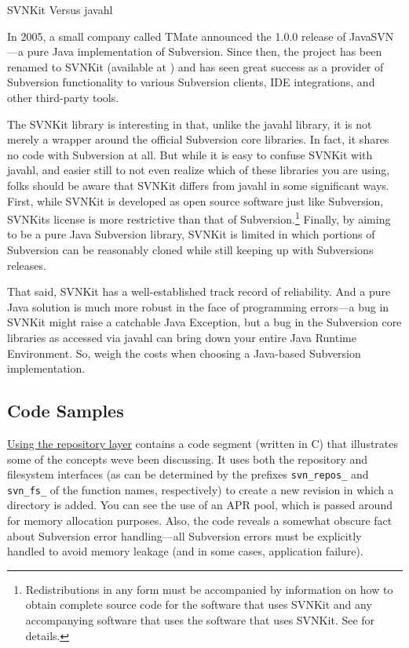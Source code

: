SVNKit Versus javahl

In 2005, a small company called TMate announced the 1.0.0 release of
JavaSVN---a pure Java implementation of Subversion. Since then, the
project has been renamed to SVNKit (available at
\href{https://svnkit.com/}{}) and has seen great success as a provider
of Subversion functionality to various Subversion clients, IDE
integrations, and other third-party tools.

The SVNKit library is interesting in that, unlike the javahl library, it
is not merely a wrapper around the official Subversion core libraries.
In fact, it shares no code with Subversion at all. But while it is easy
to confuse SVNKit with javahl, and easier still to not even realize
which of these libraries you are using, folks should be aware that
SVNKit differs from javahl in some significant ways. First, while SVNKit
is developed as open source software just like Subversion,
SVNKit\textquotesingle s license is more restrictive than that of
Subversion.\footnote{Redistributions in any form must be accompanied by
  information on how to obtain complete source code for the software
  that uses SVNKit and any accompanying software that uses the software
  that uses SVNKit. See \href{https://svnkit.com/license.html}{} for
  details.} Finally, by aiming to be a pure Java Subversion library,
SVNKit is limited in which portions of Subversion can be reasonably
cloned while still keeping up with Subversion\textquotesingle s
releases.

That said, SVNKit has a well-established track record of reliability.
And a pure Java solution is much more robust in the face of programming
errors---a bug in SVNKit might raise a catchable Java Exception, but a
bug in the Subversion core libraries as accessed via javahl can bring
down your entire Java Runtime Environment. So, weigh the costs when
choosing a Java-based Subversion implementation.

\subsection{Code Samples}\label{svn.developer.usingapi.codesamples}

\hyperref[svn.developer.layerlib.repos.ex-1]{Using the repository layer}
contains a code segment (written in C) that illustrates some of the
concepts we\textquotesingle ve been discussing. It uses both the
repository and filesystem interfaces (as can be determined by the
prefixes \texttt{svn\_repos\_} and \texttt{svn\_fs\_} of the function
names, respectively) to create a new revision in which a directory is
added. You can see the use of an APR pool, which is passed around for
memory allocation purposes. Also, the code reveals a somewhat obscure
fact about Subversion error handling---all Subversion errors must be
explicitly handled to avoid memory leakage (and in some cases,
application failure).


